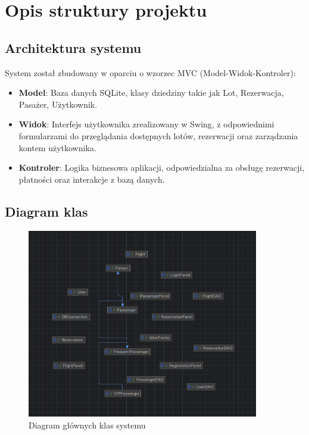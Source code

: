 \section{Opis struktury projektu}

\subsection{Architektura systemu}
System został zbudowany w oparciu o wzorzec MVC (Model-Widok-Kontroler):
\begin{itemize}
    \item \textbf{Model}: Baza danych SQLite, klasy dziedziny takie jak Lot, Rezerwacja, Pasażer, Użytkownik.
    \item \textbf{Widok}: Interfejs użytkownika zrealizowany w Swing, z odpowiednimi formularzami do przeglądania dostępnych lotów, rezerwacji oraz zarządzania kontem użytkownika.
    \item \textbf{Kontroler}: Logika biznesowa aplikacji, odpowiedzialna za obsługę rezerwacji, płatności oraz interakcje z bazą danych.
\end{itemize}

\subsection{Diagram klas}
\begin{figure}[H]
\centering
\includegraphics[width=0.9\textwidth]{figures/class_diagram.png}
\caption{Diagram głównych klas systemu}
\label{fig:class_diagram}
\end{figure}

